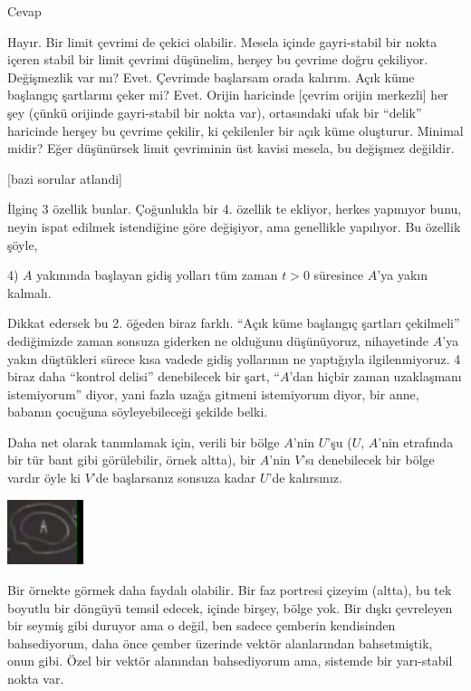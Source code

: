 \documentclass[12pt,fleqn]{article}\usepackage{../../common}
\begin{document}
Cevap 

Hayır. Bir limit çevrimi de çekici olabilir. Mesela içinde gayri-stabil bir
nokta içeren stabil bir limit çevrimi düşünelim, herşey bu çevrime doğru
çekiliyor. Değişmezlik var mı? Evet. Çevrimde başlarsam orada kalırım. Açık
küme başlangıç şartlarını çeker mi? Evet. Orijin haricinde [çevrim orijin
merkezli] her şey (çünkü orijinde gayri-stabil bir nokta var), ortasındaki
ufak bir ``delik'' haricinde herşey bu çevrime çekilir, ki çekilenler bir
açık küme oluşturur. Minimal midir? Eğer düşünürsek limit çevriminin üst
kavisi mesela, bu değişmez değildir. 

[bazi sorular atlandi]

İlginç 3 özellik bunlar. Çoğunlukla bir 4. özellik te ekliyor, herkes
yapmıyor bunu, neyin ispat edilmek istendiğine göre değişiyor, ama
genellikle yapılıyor. Bu özellik şöyle,

4) $A$ yakınında başlayan gidiş yolları tüm zaman $t > 0$ süresince $A$'ya
yakın kalmalı.

Dikkat edersek bu 2. öğeden biraz farklı. ``Açık küme başlangıç şartları
çekilmeli'' dediğimizde zaman sonsuza giderken ne olduğunu düşünüyoruz,
nihayetinde $A$'ya yakın düştükleri sürece kısa vadede gidiş yollarının ne
yaptığıyla ilgilenmiyoruz. 4 biraz daha ``kontrol delisi'' denebilecek bir
şart, ``$A$'dan hiçbir zaman uzaklaşmanı istemiyorum'' diyor, yani fazla
uzağa gitmeni istemiyorum diyor, bir anne, babanın çocuğuna söyleyebileceği
şekilde belki. 

Daha net olarak tanımlamak için, verili bir bölge $A$'nin $U$'şu ($U$,
$A$'nin etrafında bir tür bant gibi görülebilir, örnek altta), bir $A$'nin
$V$'sı denebilecek bir bölge vardır öyle ki $V$'de başlarsanız sonsuza
kadar $U$'de kalırsınız.

\includegraphics[width=6em]{18_02.png}

Bir örnekte görmek daha faydalı olabilir. Bir faz portresi çizeyim (altta),
bu tek boyutlu bir döngüyü temsil edecek, içinde birşey, bölge yok. Bir
dışkı çevreleyen bir seymiş gibi duruyor ama o değil, ben sadece çemberin
kendisinden bahsediyorum, daha önce çember üzerinde vektör alanlarından
bahsetmiştik, onun gibi. Özel bir vektör alanından bahsediyorum ama,
sistemde bir yarı-stabil nokta var. 
\end{document}
